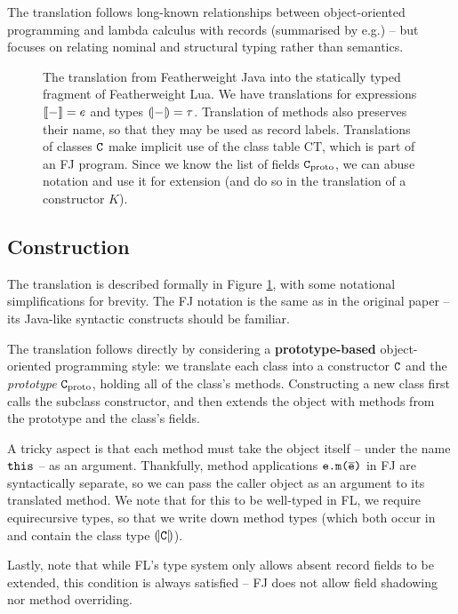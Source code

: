 The translation follows long-known relationships between object-oriented programming and lambda calculus with records (summarised by e.g.\@ \textcite{pierce-thesis}) -- but focuses on relating nominal and structural typing rather than semantics.


\begin{figure}
    \centering
    
    \caption{The translation from Featherweight Java into the statically typed fragment of Featherweight Lua. We have translations for expressions $\denot{-} = e$ and types $\denoty{-} = \tau$. Translation of methods also preserves their name, so that they may be used as record labels. Translations of classes $\texttt{C}$ make implicit use of the class table $\mathrm{CT}$, which is part of an FJ program. Since we know the list of fields $\texttt{C}_\mathrm{proto}$, we can abuse notation and use it for extension (and do so in the translation of a constructor $K$).}
    \label{fig:translation}
\end{figure}

\subsection{Construction}

The translation is described formally in Figure \ref{fig:translation}, with some notational simplifications for brevity. The FJ notation is the same as in the original paper \cite{featherweight-java} -- its Java-like syntactic constructs should be familiar.

The translation follows directly by considering a \textbf{prototype-based} object-oriented programming style: we translate each class into a constructor $\texttt{C}$ and the \emph{prototype} $\texttt{C}_\mathrm{proto}$, holding all of the class's methods. Constructing a new class first calls the subclass constructor, and then extends the object with methods from the prototype and the class's fields.

A tricky aspect is that each method must take the object itself -- under the name $\texttt{this}$ -- as an argument. Thankfully, method applications $\texttt{e.m($\overline{\mbox{e}}$)}$ in FJ are syntactically separate, so we can pass the caller object as an argument to its translated method. 
We note that for this to be well-typed in FL, we require equirecursive types, so that we write down method types (which both occur in and contain the class type $\denoty{\fj C}$).

Lastly, note that while FL's type system only allows absent record fields to be extended, this condition is always satisfied -- FJ does not allow field shadowing nor method overriding.

